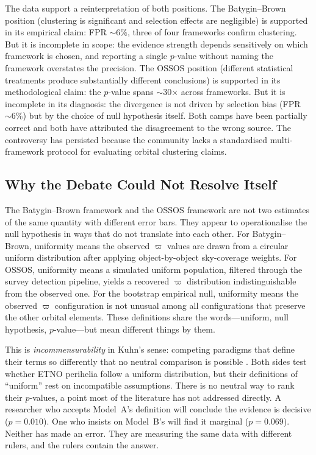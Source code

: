 \documentclass{aa}
\begin{document}
The data support a reinterpretation of both positions. The Batygin--Brown position (clustering is significant and selection effects are negligible) is supported in its empirical claim: FPR $\sim6\%$, three of four frameworks confirm clustering. But it is incomplete in scope: the evidence strength depends sensitively on which framework is chosen, and reporting a single $p$-value without naming the framework overstates the precision. The OSSOS position (different statistical treatments produce substantially different conclusions) is supported in its methodological claim: the $p$-value spans $\sim$30$\times$ across frameworks. But it is incomplete in its diagnosis: the divergence is not driven by selection bias (FPR $\sim6\%$) but by the choice of null hypothesis itself. Both camps have been partially correct and both have attributed the disagreement to the wrong source. The controversy has persisted because the community lacks a standardised multi-framework protocol for evaluating orbital clustering claims.

\subsection{Why the Debate Could Not Resolve Itself}

The Batygin--Brown framework and the OSSOS framework are not two estimates of the same quantity with different error bars. They appear to operationalise the null hypothesis in ways that do not translate into each other. For Batygin--Brown, uniformity means the observed $\varpi$ values are drawn from a circular uniform distribution after applying object-by-object sky-coverage weights. For OSSOS, uniformity means a simulated uniform population, filtered through the survey detection pipeline, yields a recovered $\varpi$ distribution indistinguishable from the observed one. For the bootstrap empirical null, uniformity means the observed $\varpi$ configuration is not unusual among all configurations that preserve the other orbital elements. These definitions share the words---uniform, null hypothesis, $p$-value---but mean different things by them.

This is \textit{incommensurability} in Kuhn's sense: competing paradigms that define their terms so differently that no neutral comparison is possible \citep{kuhn1962}. Both sides test whether ETNO perihelia follow a uniform distribution, but their definitions of ``uniform'' rest on incompatible assumptions. There is no neutral way to rank their $p$-values, a point most of the literature has not addressed directly. A researcher who accepts Model~A's definition will conclude the evidence is decisive ($p=0.010$). One who insists on Model~B's will find it marginal ($p=0.069$). Neither has made an error. They are measuring the same data with different rulers, and the rulers contain the answer.
\end{document}
